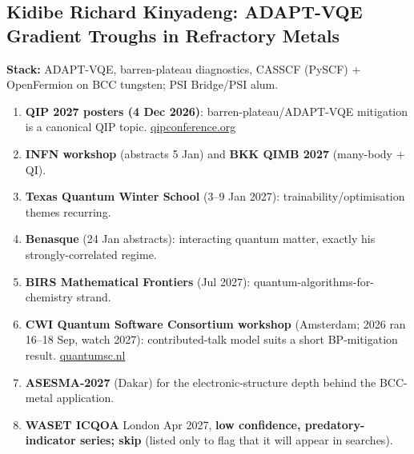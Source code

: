 \documentclass[11pt,a4paper]{article}
\begin{document}
\subsection{Kidibe Richard Kinyadeng: ADAPT-VQE Gradient Troughs in Refractory Metals}
\textbf{Stack:} ADAPT-VQE, barren-plateau diagnostics, CASSCF (PySCF) $+$ OpenFermion on BCC tungsten; PSI Bridge/PSI alum.
\begin{enumerate}[leftmargin=1.6em]
  \item \textbf{QIP 2027 posters (4 Dec 2026)}: barren-plateau/ADAPT-VQE mitigation is a canonical QIP topic. \href{https://qipconference.org/2027/call/}{qipconference.org}
  \item \textbf{INFN workshop} (abstracts 5 Jan) and \textbf{BKK QIMB 2027} (many-body $+$ QI).
  \item \textbf{Texas Quantum Winter School} (3--9 Jan 2027): trainability/optimisation themes recurring.
  \item \textbf{Benasque} (24 Jan abstracts): interacting quantum matter, exactly his strongly-correlated regime.
  \item \textbf{BIRS Mathematical Frontiers} (Jul 2027): quantum-algorithms-for-chemistry strand.
  \item \textbf{CWI Quantum Software Consortium workshop} (Amsterdam; 2026 ran 16--18 Sep, watch 2027): contributed-talk model suits a short BP-mitigation result. \href{https://www.quantumsc.nl/Events/Upcoming-events/event/150/Workshop-on-Quantum-Algorithms-QA-}{quantumsc.nl}
  \item \textbf{ASESMA-2027} (Dakar) for the electronic-structure depth behind the BCC-metal application.
  \item \textbf{WASET ICQOA} London Apr 2027, \textbf{low confidence, predatory-indicator series; skip} (listed only to flag that it will appear in searches).
\end{enumerate}
\end{document}
